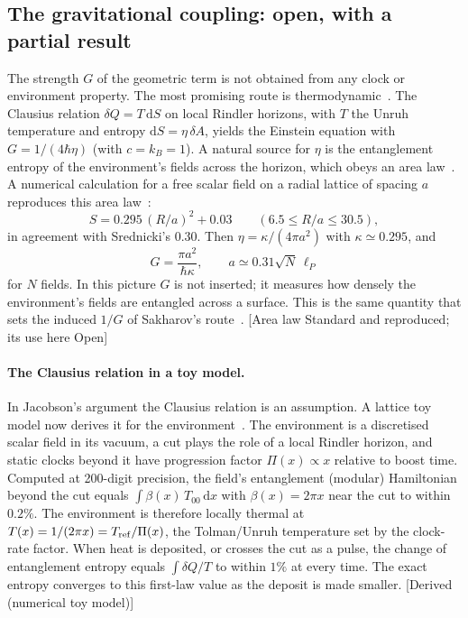 \documentclass[11pt]{article}
\newcommand{\Pg}{\Pi}                 %
\newcommand{\dd}{\mathrm{d}}
\newcommand{\st}[1]{\textsf{\small[#1]}}
\theoremstyle{plain}
\theoremstyle{definition}
\theoremstyle{remark}
\begin{document}
\subsection{The gravitational coupling: open, with a partial result}

The strength $G$ of the geometric term is not obtained from any clock or environment property. The most promising route is thermodynamic~\cite{Jacobson1995}. The Clausius relation $\delta Q=T\,\dd S$ on local Rindler horizons, with $T$ the Unruh temperature and entropy $\dd S=\eta\,\delta A$, yields the Einstein equation with $G=1/(4\hbar\eta)$ (with $c=k_B=1$). A natural source for $\eta$ is the entanglement entropy of the environment's fields across the horizon, which obeys an area law~\cite{Bombelli1986,Srednicki1993}. A numerical calculation for a free scalar field on a radial lattice of spacing $a$ reproduces this area law~\cite{JordanNote2}:
\begin{equation}
S=0.295\,(R/a)^2+0.03\qquad(6.5\le R/a\le30.5),
\end{equation}
in agreement with Srednicki's $0.30$. Then $\eta=\kappa/(4\pi a^2)$ with $\kappa\simeq0.295$, and
\begin{equation}
G=\frac{\pi a^2}{\hbar\kappa},\qquad a\simeq0.31\sqrt{N}\,\ell_P
\end{equation}
for $N$ fields. In this picture $G$ is not inserted; it measures how densely the environment's fields are entangled across a surface. This is the same quantity that sets the induced $1/G$ of Sakharov's route~\cite{Jacobson1994}. \st{Area law Standard and reproduced; its use here Open}

\paragraph{The Clausius relation in a toy model.}
In Jacobson's argument the Clausius relation is an assumption. A lattice toy model now derives it for the environment~\cite{JordanNote3}. The environment is a discretised scalar field in its vacuum, a cut plays the role of a local Rindler horizon, and static clocks beyond it have progression factor $\Pg(x)\propto x$ relative to boost time. Computed at 200-digit precision, the field's entanglement (modular) Hamiltonian beyond the cut equals $\int\beta(x)\,T_{00}\,\dd x$ with $\beta(x)=2\pi x$ near the cut to within $0.2\%$. The environment is therefore locally thermal at $T(x)=1/(2\pi x)=T_{\rm ref}/\Pg(x)$, the Tolman/Unruh temperature set by the clock-rate factor. When heat is deposited, or crosses the cut as a pulse, the change of entanglement entropy equals $\int\delta Q/T$ to within $1\%$ at every time. The exact entropy converges to this first-law value as the deposit is made smaller. \st{Derived (numerical toy model)}
\end{document}
